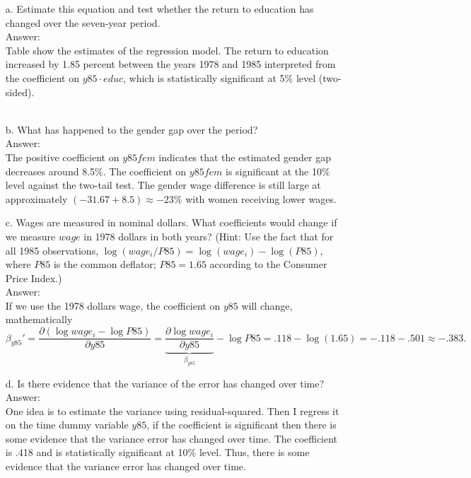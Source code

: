 \documentclass[10pt]{article}
\begin{document}
\begin{enumerate}
\item[a.] Estimate this equation and test whether the return to education has changed over the seven-year period.
\\ Answer: \\
Table show the estimates of the regression model. The return to education increased by 1.85 percent between the years 1978 and 1985 interpreted from the coefficient on $y85\cdot educ$, which is statistically significant at 5\% level (two-sided).\\ \\


\item[b.] What has happened to the gender gap over the period? 
\\ Answer: \\
The positive coefficient on $y85fem$ indicates that the estimated gender gap decreases around 8.5\%. The coefficient on $y85fem$ is significant at the 10\% level against the two-tail test. The gender wage difference is still large at approximately $(-31.67+8.5)\approx -23\%$ with women receiving lower wages.

\item[c.] Wages are measured in nominal dollars. What coefficients would change if we measure $wage$ in 1978 dollars in both years? (Hint: Use the fact that for all 1985 observations, $\log(wage_i/P85)=\log(wage_i)-\log(P85)$, where $P85$ is the common deflator; $P85=1.65$ according to the Consumer Price Index.)
\\ Answer: \\
If we use the 1978 dollars wage, the coefficient on $y85$ will change, mathematically
\[\beta_{y85}'=\frac{\partial (\log{wage_i}-\log{P85})}{\partial y85}=\underbrace{\frac{\partial \log{wage_i}}{\partial y85}}_{\displaystyle \beta_{y85}}-\log{P85}=.118-\log(1.65)=-.118-.501\approx -.383.\]

\item[d.] Is there evidence that the variance of the error has changed over time?
\\ Answer: \\
One idea is to estimate the variance using residual-squared. Then I regress it on the time dummy variable $y85$, if the coefficient is significant then there is some evidence that the variance error has changed over time. The coefficient is .418 and is statistically significant at 10\% level. Thus, there is some evidence that the variance error has changed over time. \\ \\



\end{enumerate}
\end{document}
